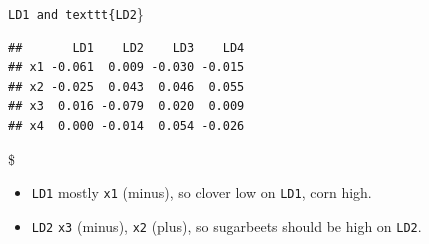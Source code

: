 \documentclass[ignorenonframetext,]{beamer}
\newenvironment{Shaded}{\begin{snugshade}}{\end{snugshade}}
\newcommand{\DecValTok}[1]{\textcolor[rgb]{0.00,0.00,0.81}{#1}}
\newcommand{\KeywordTok}[1]{\textcolor[rgb]{0.13,0.29,0.53}{\textbf{#1}}}
\newcommand{\NormalTok}[1]{#1}
\newcommand{\OperatorTok}[1]{\textcolor[rgb]{0.81,0.36,0.00}{\textbf{#1}}}
\begin{document}
\begin{frame}[fragile]{\texttt{LD1\ and\ texttt\{LD2}\}}
\protect\hypertarget{ld1-and-textttld2}{}

\begin{Shaded}
\end{Shaded}

\begin{verbatim}
##       LD1    LD2    LD3    LD4
## x1 -0.061  0.009 -0.030 -0.015
## x2 -0.025  0.043  0.046  0.055
## x3  0.016 -0.079  0.020  0.009
## x4  0.000 -0.014  0.054 -0.026
\end{verbatim}

\$

\begin{itemize}
\item
  \texttt{LD1} mostly \texttt{x1} (minus), so clover low on
  \texttt{LD1}, corn high.
\item
  \texttt{LD2} \texttt{x3} (minus), \texttt{x2} (plus), so sugarbeets
  should be high on \texttt{LD2}.
\end{itemize}

\end{frame}
\end{document}
